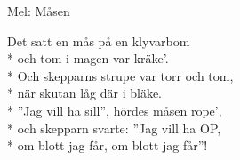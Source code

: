 \begin{SongText}[Måsen]
    \begin{SongInfo}
        Mel: Måsen
    \end{SongInfo}
    \begin{SongVerse}
        Det satt en mås på en klyvarbom\\*%
        och tom i magen var kräke’.\\*%
        Och skepparns strupe var torr och tom,\\*%
        när skutan låg där i bläke.\\*%
        ”Jag vill ha sill”, hördes måsen rope’,\\*%
        och skepparn svarte: ”Jag vill ha OP,\\*%
        om blott jag får, om blott jag får”!
    \end{SongVerse}
\end{SongText}
